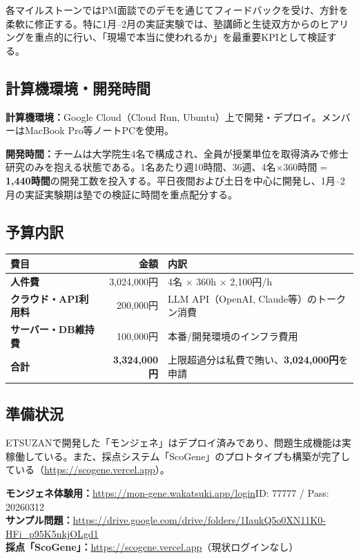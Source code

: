 \documentclass[paper=a4,fontsize=10.5bp,jafontsize=10.5bp,twocolumn]{jlreq}
\begin{document}
\noindent
各マイルストーンではPM面談でのデモを通じてフィードバックを受け、方針を柔軟に修正する。特に1月--2月の実証実験では、塾講師と生徒双方からのヒアリングを重点的に行い、「現場で本当に使われるか」を最重要KPIとして検証する。

\subsection{計算機環境・開発時間}

\noindent\textbf{計算機環境：}Google Cloud（Cloud Run, Ubuntu）上で開発・デプロイ。メンバーはMacBook Pro等ノートPCを使用。

\noindent\textbf{開発時間：}チームは大学院生4名で構成され、全員が授業単位を取得済みで修士研究のみを抱える状態である。1名あたり週10時間、36週、4名$\times$360時間$=$\textbf{1,440時間}の開発工数を投入する。平日夜間および土日を中心に開発し、1月--2月の実証実験期は塾での検証に時間を重点配分する。

\subsection{予算内訳}

\begin{scriptsize}\noindent
\begin{tabularx}{\linewidth}{>{\bfseries}l r X}
\toprule
費目 & 金額 & 内訳 \\
\midrule
人件費 & 3,024,000円 & 4名 $\times$ 360h $\times$ 2,100円/h \\
クラウド・API利用料 & 200,000円 & LLM API（OpenAI, Claude等）のトークン消費 \\
サーバー・DB維持費 & 100,000円 & 本番/開発環境のインフラ費用 \\
\midrule
\textbf{合計} & \textbf{3,324,000円} & 上限超過分は私費で賄い、\textbf{3,024,000円}を申請 \\
\bottomrule
\end{tabularx}
\end{scriptsize}

\subsection{準備状況}

ETSUZANで開発した「モンジェネ」はデプロイ済みであり、問題生成機能は実稼働している。また、採点システム「ScoGene」のプロトタイプも構築が完了している（\url{https://scogene.vercel.app}）。

\begin{graybox}
\scriptsize\sffamily
\textbf{モンジェネ体験用：}\url{https://mon-gene.wakatsuki.app/login}\quad ID: 77777 / Pass: 20260312\\
\textbf{サンプル問題：}\url{https://drive.google.com/drive/folders/1IaukQ5o0XN11K0-HFi_p95K5nkjOLgd1}\\
\textbf{採点「ScoGene」：}\url{https://scogene.vercel.app}（現状ログインなし）
\end{graybox}
\end{document}
